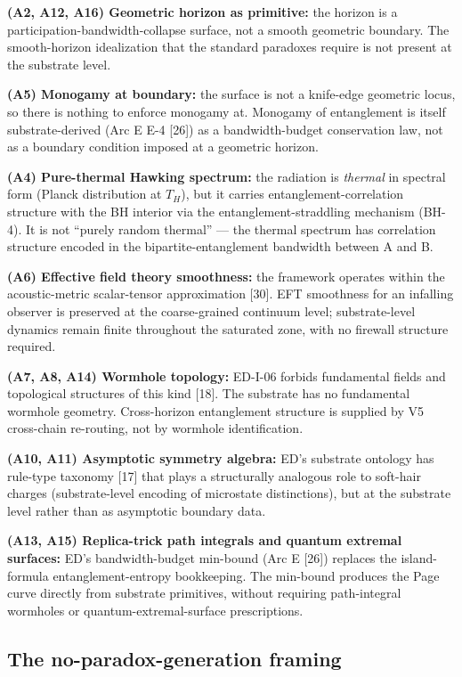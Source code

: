 \documentclass[11pt,a4paper]{article}
\begin{document}
\textbf{(A2, A12, A16) Geometric horizon as primitive:} the horizon is a participation-bandwidth-collapse surface, not a smooth geometric boundary. The smooth-horizon idealization that the standard paradoxes require is not present at the substrate level.

\textbf{(A5) Monogamy at boundary:} the surface is not a knife-edge geometric locus, so there is nothing to enforce monogamy at. Monogamy of entanglement is itself substrate-derived (Arc E E-4 [26]) as a bandwidth-budget conservation law, not as a boundary condition imposed at a geometric horizon.

\textbf{(A4) Pure-thermal Hawking spectrum:} the radiation is \emph{thermal} in spectral form (Planck distribution at $T_H$), but it carries entanglement-correlation structure with the BH interior via the entanglement-straddling mechanism (BH-4). It is not ``purely random thermal'' --- the thermal spectrum has correlation structure encoded in the bipartite-entanglement bandwidth between A and B.

\textbf{(A6) Effective field theory smoothness:} the framework operates within the acoustic-metric scalar-tensor approximation [30]. EFT smoothness for an infalling observer is preserved at the coarse-grained continuum level; substrate-level dynamics remain finite throughout the saturated zone, with no firewall structure required.

\textbf{(A7, A8, A14) Wormhole topology:} ED-I-06 forbids fundamental fields and topological structures of this kind [18]. The substrate has no fundamental wormhole geometry. Cross-horizon entanglement structure is supplied by V5 cross-chain re-routing, not by wormhole identification.

\textbf{(A10, A11) Asymptotic symmetry algebra:} ED's substrate ontology has rule-type taxonomy [17] that plays a structurally analogous role to soft-hair charges (substrate-level encoding of microstate distinctions), but at the substrate level rather than as asymptotic boundary data.

\textbf{(A13, A15) Replica-trick path integrals and quantum extremal surfaces:} ED's bandwidth-budget min-bound (Arc E [26]) replaces the island-formula entanglement-entropy bookkeeping. The min-bound produces the Page curve directly from substrate primitives, without requiring path-integral wormholes or quantum-extremal-surface prescriptions.

\subsection{The no-paradox-generation framing}
\end{document}
